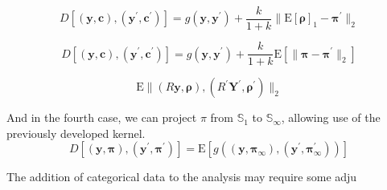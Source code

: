   \[
    D\left[(\bm{y},\bm{c}), (\bm{y}^{\prime}, \bm{c}^{\prime})\right] = 
      g(\bm{y},\bm{y}^{\prime}) + 
          \frac{k}{1 + k}\lVert \text{E}[\bm{\rho}]_1 - \bm{\pi}^{\prime}\rVert_2
  \]
  
  \begin{equation*}
    D\left[(\bm{y},\bm{c}), (\bm{y}^{\prime}, \bm{c}^{\prime})\right] = 
      g(\bm{y},\bm{y}^{\prime}) + 
        \frac{k}{1 + k}\text{E}\left[\lVert \bm{\pi} - \bm{\pi}^{\prime}\rVert_2\right]
  \end{equation*}

  \[
    \text{E}\lVert (R\bm{y},\bm{\rho}), (R^\prime\bm{Y}^\prime,\bm{\rho}^\prime)\rVert_2
  \]


And in the fourth case, we can project $\pi$ from $\mathbb{S}_1$ to 
  $\mathbb{S}_{\infty}$, allowing use of the previously developed kernel.
  \begin{equation*}
    D\left[(\bm{y},\bm{\pi}), (\bm{y}^{\prime}, \bm{\pi}^{\prime})\right] = 
      \text{E}\left[ g\left((\bm{y},\bm{\pi}_{\infty}), 
            (\bm{y}^{\prime},\bm{\pi}_{\infty}^{\prime})\right)\right]
  \end{equation*}

The addition of categorical data to the analysis may require some adju

